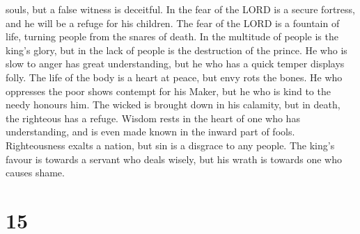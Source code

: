 souls, but a false witness is deceitful.  In the fear of
the LORD is a secure fortress, and he will be a refuge for his children.
 The fear of the LORD is a fountain of life, turning people
from the snares of death.  In the multitude of people is
the king's glory, but in the lack of people is the destruction of the
prince.  He who is slow to anger has great understanding,
but he who has a quick temper displays folly.  The life of
the body is a heart at peace, but envy rots the bones.  He
who oppresses the poor shows contempt for his Maker, but he who is kind
to the needy honours him.  The wicked is brought down in
his calamity, but in death, the righteous has a refuge. 
Wisdom rests in the heart of one who has understanding, and is even made
known in the inward part of fools.  Righteousness exalts a
nation, but sin is a disgrace to any people.  The king's
favour is towards a servant who deals wisely, but his wrath is towards
one who causes shame.

\hypertarget{section-14}{%
\section{15}\label{section-14}}


